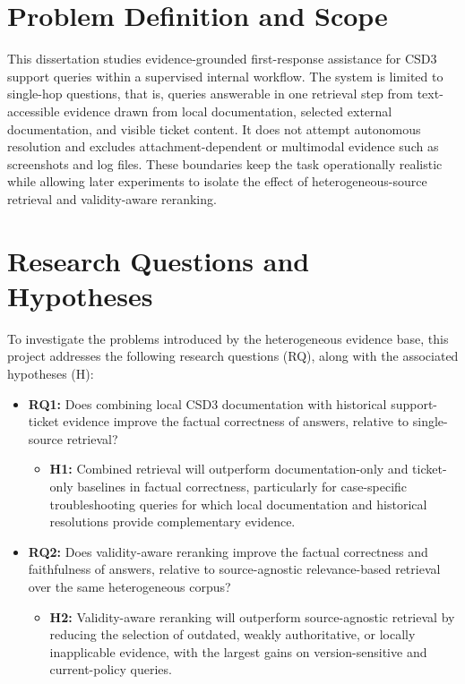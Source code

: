 \section{Problem Definition and Scope}
\label{sec:problem}

This dissertation studies evidence-grounded first-response assistance for \ac{CSD3} support queries within a supervised internal workflow. The system is limited to single-hop questions, that is, queries answerable in one retrieval step from text-accessible evidence drawn from local documentation, selected external documentation, and visible ticket content. It does not attempt autonomous resolution and excludes attachment-dependent or multimodal evidence such as screenshots and log files. These boundaries keep the task operationally realistic while allowing later experiments to isolate the effect of heterogeneous-source retrieval and validity-aware reranking. 

\section{Research Questions and Hypotheses}
\label{sec:questions}

To investigate the problems introduced by the heterogeneous evidence base, this project addresses the following research questions (RQ), along with the associated hypotheses (H):

\begin{itemize}
    \item \textbf{RQ1:} \label{rq:1-source} Does combining local \ac{CSD3} documentation with historical support-ticket evidence improve the factual correctness of answers, relative to single-source retrieval?
    \begin{itemize}
        \item \textbf{H1:} Combined retrieval will outperform documentation-only and ticket-only baselines in factual correctness, particularly for case-specific troubleshooting queries for which local documentation and historical resolutions provide complementary evidence.  
    \end{itemize}
    \item \textbf{RQ2:} \label{rq:2-validity} Does validity-aware reranking improve the factual correctness and faithfulness of answers, relative to source-agnostic relevance-based retrieval over the same heterogeneous corpus?
    \begin{itemize}
        \item \textbf{H2:} Validity-aware reranking will outperform source-agnostic retrieval by reducing the selection of outdated, weakly authoritative, or locally inapplicable evidence, with the largest gains on version-sensitive and current-policy queries.
    \end{itemize}
\end{itemize}

